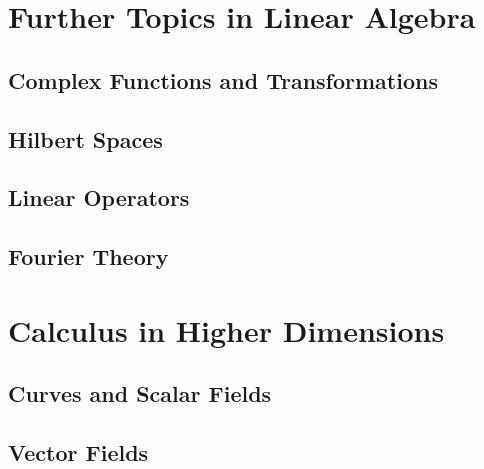 \documentclass[12pt,letterpaper, openany]{book} %
\begin{document}
 
\frontmatter



%
 
\clearpage
\thispagestyle{empty}
 
\tableofcontents
 
\mainmatter

\setcounter{part}{4}
\part{Further Topics in Linear Algebra}

\chapter{Complex Functions and Transformations}
 

\chapter{Hilbert Spaces}


\chapter{Linear Operators}


\chapter{Fourier Theory}


\part{Calculus in Higher Dimensions}

\chapter{Curves and Scalar Fields}


\chapter{Vector Fields}

\end{document}
